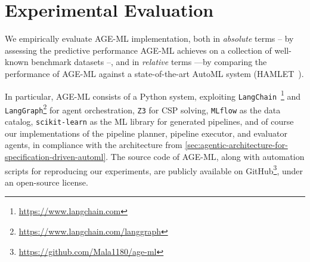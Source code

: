 \documentclass[runningheads]{llncs}
\newcommand{\sidenote}[3]{\todo[linecolor=#1,backgroundcolor=#1!25,bordercolor=#1,size=\tiny]{\textbf{#2:} #3}}
\newcommand{\malasidenote}[1]{\sidenote{violet}{Mattia}{#1}}
\newcommand{\ourapproach}[0]{\textsc{AGE-ML}}
\begin{document}


\section{Experimental Evaluation}
\label{sec:experimental-evaluation}

We empirically evaluate \ourapproach{} implementation,
both in \emph{absolute} terms
-- by assessing the predictive performance \ourapproach{} achieves on a collection of well-known benchmark datasets --,
and in \emph{relative} terms%
---by comparing the performance of \ourapproach{} against a state-of-the-art \ac{AutoML} system
(HAMLET~\cite{FranciaGP23}).

In particular,
\ourapproach{} consists of a Python system,
exploiting \texttt{LangChain}~\cite{Mavroudis2024}\footnote{\url{https://www.langchain.com}} and \texttt{LangGraph}\footnote{\url{https://www.langchain.com/langgraph}} for agent orchestration,
\texttt{Z3} for \ac{CSP} solving,
\texttt{MLflow} as the data catalog,
\texttt{scikit-learn} as the \ac{ML} library for generated pipelines,
and
of course our implementations of the pipeline planner, pipeline executor, and evaluator agents,
in compliance with the architecture from \cref{sec:agentic-architecture-for-specification-driven-automl}.
%
The source code of \ourapproach{},
along with automation scripts for reproducing our experiments,
are publicly available on GitHub\footnote{\label{url:repo}\url{https://github.com/Mala1180/age-ml}},
under an open-source license.
\end{document}
